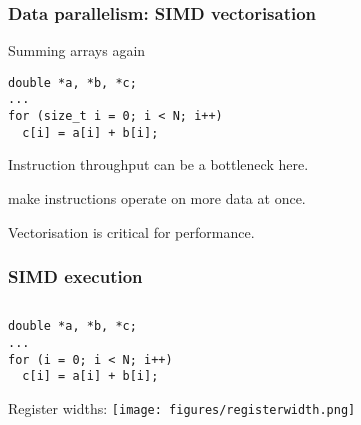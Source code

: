 \documentclass[dvipsnames,presentation,aspectratio=169,14pt]{beamer}
\begin{document}
\begin{frame}[fragile]
  \frametitle{Data parallelism: SIMD vectorisation}

  \begin{exampleblock}{Summing arrays again}
\begin{verbatim}
double *a, *b, *c;
...
for (size_t i = 0; i < N; i++)
  c[i] = a[i] + b[i];
\end{verbatim}

    \vskip 5pt

    Instruction throughput can be a bottleneck here.

    \vskip 3pt

     make instructions operate on more data at once.

    \vskip 3pt
  \end{exampleblock}

  \vskip 8pt

  Vectorisation is critical for  performance.

\end{frame}

\begin{frame}[fragile]
  \frametitle{SIMD execution}
  \begin{columns}
    \begin{column}{0.4\textwidth}
\begin{verbatim}
double *a, *b, *c;
...
for (i = 0; i < N; i++)
  c[i] = a[i] + b[i];
\end{verbatim}

      \vspace{\baselineskip}
      Register widths:
      \vspace{\baselineskip}
      \texttt{[image: figures/registerwidth.png]}
    \end{column}
    \begin{column}{0.6\textwidth}
    \end{column}
  \end{columns}
\end{frame}
\end{document}
